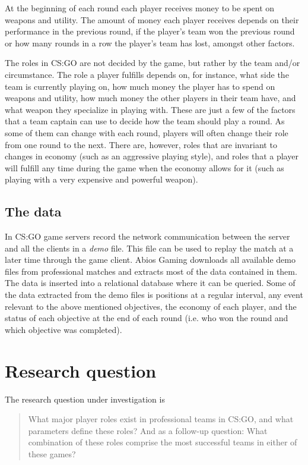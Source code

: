 \documentclass{article}
\begin{document}
At the beginning of each round each player receives money to be spent on weapons and utility. The amount of money each player receives depends on their performance in the previous round, if the player's team won the previous round or how many rounds in a row the player's team has lost, amongst other factors.

The roles in CS:GO are not decided by the game, but rather by the team and/or circumstance. The role a player fulfills depends on, for instance, what side the team is currently playing on, how much money the player has to spend on weapons and utility, how much money the other players in their team have, and what weapon they specialize in playing with. These are just a few of the factors that a team captain can use to decide how the team should play a round. As some of them can change with each round, players will often change their role from one round to the next. There are, however, roles that are invariant to changes in economy (such as an aggressive playing style), and roles that a player will fulfill any time during the game when the economy allows for it (such as playing with a very expensive and powerful weapon).

\subsection{The data}
In CS:GO game servers record the network communication between the server and all the clients in a {\it demo} file. This file can be used to replay the match at a later time through the game client. Abios Gaming downloads all available demo files from professional matches and extracts most of the data contained in them. The data is inserted into a relational database where it can be queried. Some of the data extracted from the demo files is positions at a regular interval, any event relevant to the above mentioned objectives, the economy of each player, and the status of each objective at the end of each round (i.e. who won the round and which objective was completed).

\section{Research question}
The research question under investigation is
\begin{quote}
    What major player roles exist in professional teams in CS:GO, and what parameters define these roles? And as a follow-up question: What combination of these roles comprise the most successful teams in either of these games?
\end{quote}
\end{document}
